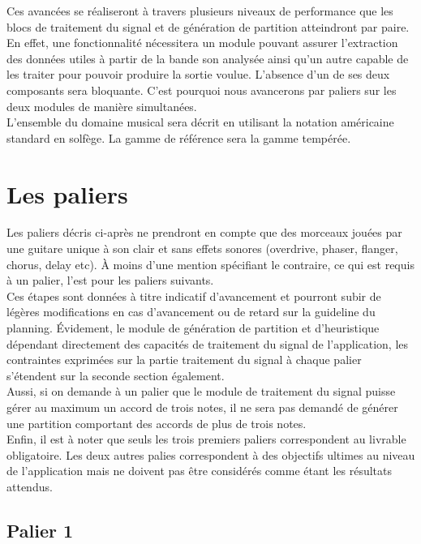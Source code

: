 \documentclass[12pt]{article}
\begin{document}
Ces avancées se réaliseront à travers plusieurs niveaux de performance que les blocs de traitement du signal et de génération de partition atteindront par paire. En effet, une fonctionnalité nécessitera un module pouvant assurer l’extraction des données utiles à partir de la bande son analysée ainsi qu’un autre capable de les traiter pour pouvoir produire la sortie voulue. L’absence d’un de ses deux composants sera bloquante. C’est pourquoi nous avancerons par paliers sur les deux modules de manière simultanées. \\

L’ensemble du domaine musical sera décrit en utilisant la notation américaine standard en solfège. La gamme de référence sera la gamme tempérée. \\

\newpage
\section{Les paliers}

Les paliers décris ci-après ne prendront en compte que des morceaux jouées par une guitare unique à son clair et sans effets sonores (overdrive, phaser, flanger, chorus, delay etc). À moins d’une mention spécifiant le contraire, ce qui est requis à un palier, l’est pour les paliers suivants.\\

Ces étapes sont données à titre indicatif d’avancement et pourront subir de légères modifications en cas d’avancement ou de retard sur la guideline du planning. Évidement, le module de génération de partition et d’heuristique dépendant directement des capacités de traitement du signal de l’application, les contraintes exprimées sur la partie traitement du signal à chaque palier s’étendent sur la seconde section également.\\

Aussi, si on demande à un palier que le module de traitement du signal puisse gérer au maximum un accord de trois notes, il ne sera pas demandé de générer une partition comportant des accords de plus de trois notes.\\

Enfin, il est à noter que seuls les trois premiers paliers correspondent au livrable obligatoire. Les deux autres palies correspondent à des objectifs ultimes au niveau de l'application mais ne doivent pas être considérés comme étant les résultats attendus.

\newpage
\subsection{Palier 1}
\end{document}

